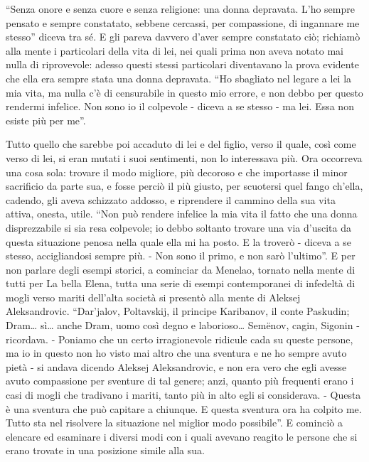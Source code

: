 ``Senza onore e senza cuore e senza religione: una donna depravata. L'ho sempre pensato e sempre constatato, sebbene cercassi, per compassione, di ingannare me stesso'' diceva tra sé. E gli pareva davvero d'aver sempre constatato ciò; richiamò alla mente i particolari della vita di lei, nei quali prima non aveva notato mai nulla di riprovevole: adesso questi stessi particolari diventavano la prova evidente che ella era sempre stata una donna depravata. ``Ho sbagliato nel legare a lei la mia vita, ma nulla c'è di censurabile in questo mio errore, e non debbo per questo rendermi infelice. Non sono io il colpevole - diceva a se stesso - ma lei. Essa non esiste più per me''. 

Tutto quello che sarebbe poi accaduto di lei e del figlio, verso il quale, così come verso di lei, si eran mutati i suoi sentimenti, non lo interessava più. Ora occorreva una cosa sola: trovare il modo migliore, più decoroso e che importasse il minor sacrificio da parte sua, e fosse perciò il più giusto, per scuotersi quel fango ch'ella, cadendo, gli aveva schizzato addosso, e riprendere il cammino della sua vita attiva, onesta, utile. ``Non può rendere infelice la mia vita il fatto che una donna disprezzabile si sia resa colpevole; io debbo soltanto trovare una via d'uscita da questa situazione penosa nella quale ella mi ha posto. E la troverò - diceva a se stesso, accigliandosi sempre più. - Non sono il primo, e non sarò l'ultimo''. E per non parlare degli esempi storici, a cominciar da Menelao, tornato nella mente di tutti per La bella Elena, tutta una serie di esempi contemporanei di infedeltà di mogli verso mariti dell'alta società si presentò alla mente di Aleksej Aleksandrovic. ``Dar'jalov, Poltavskij, il principe Karibanov, il conte Paskudin; Dram\ldots{} sì\ldots{} anche Dram, uomo così degno e laborioso\ldots{} Semënov, cagin, Sigonin - ricordava. - Poniamo che un certo irragionevole ridicule cada su queste persone, ma io in questo non ho visto mai altro che una sventura e ne ho sempre avuto pietà - si andava dicendo Aleksej Aleksandrovic, e non era vero che egli avesse avuto compassione per sventure di tal genere; anzi, quanto più frequenti erano i casi di mogli che tradivano i mariti, tanto più in alto egli si considerava. - Questa è una sventura che può capitare a chiunque. E questa sventura ora ha colpito me. Tutto sta nel risolvere la situazione nel miglior modo possibile''. E cominciò a elencare ed esaminare i diversi modi con i quali avevano reagito le persone che si erano trovate in una posizione simile alla sua. 

